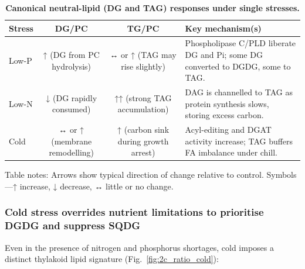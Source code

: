 \documentclass[10pt,letterpaper]{article}
\begin{document}
\begin{table}[!ht]
  \begin{adjustwidth}{-2.25in}{0in} %
    \centering
    \caption{{\bf Canonical neutral-lipid (DG and TAG) responses under single stresses.}}
    \begin{tabular}{|l|c|c|p{4in}|}
      \hline
      \textbf{Stress} & \textbf{DG/PC} & \textbf{TG/PC} & \textbf{Key mechanism(s)} \\ \hline
      Low-P  & ↑ (DG from PC hydrolysis) & ↔ or ↑ (TAG may rise slightly) &
      Phospholipase C/PLD liberate DG and Pi; some DG converted to DGDG, some to TAG. \\ \hline
      Low-N  & ↓ (DG rapidly consumed) & ↑↑ (strong TAG accumulation) &
      DAG is channelled to TAG as protein synthesis slows, storing excess carbon. \\ \hline
      Cold   & ↔ or ↑ (membrane remodelling) & ↑ (carbon sink during growth arrest) &
      Acyl-editing and DGAT activity increase; TAG buffers FA imbalance under chill. \\ \hline
    \end{tabular}
    \begin{flushleft}
      Table notes: Arrows show typical direction of change relative to control.
      Symbols—↑ increase, ↓ decrease, ↔ little or no change.
    \end{flushleft}
    \label{table:neutral_lipid_responses}
  \end{adjustwidth}
\end{table}



\subsubsection*{Cold stress overrides nutrient limitations to prioritise DGDG and suppress SQDG}

Even in the presence of nitrogen and phosphorus shortages, cold imposes a
distinct thylakoid lipid signature (Fig.~\ref{fig:2c_ratio_cold}):
\end{document}
